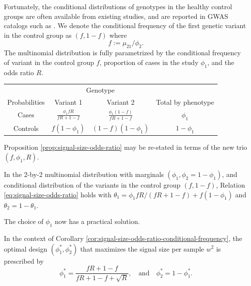 Fortunately, the conditional distributions of genotypes in the healthy control groups are often available from existing studies, and are reported in GWAS catalogs such as \cite{macarthur2016new}.
We denote the conditional frequency of the first genetic variant in the control group as $(f, 1-f)$ where
$$
f := \mu_{21} / \phi_2.
$$
The multinomial distribution is fully parametrized by the conditional frequency of variant in the control group $f$, proportion of cases in the study $\phi_1$, and the odds ratio $R$.
\begin{center}
    \begin{tabular}{cccc}
    \hline
    & \multicolumn{2}{c}{Genotype} \\
    \cline{2-3}
    Probabilities & Variant 1 & Variant 2 & Total by phenotype \\
    \hline
    Cases & $\frac{\phi_1fR}{fR+1-f}$ & $\frac{\phi_1(1-f)}{fR+1-f}$ & $\phi_1$ \\
    Controls & $f(1-\phi_1)$ & $(1-f)(1-\phi_1)$ & $1-\phi_1$ \\
    \hline
    \end{tabular}
\end{center}
Proposition \ref{prop:signal-size-odds-ratio} may be re-stated in terms of the new trio $(f, \phi_1, R)$.


\begin{corollary} \label{cor:signal-size-odds-ratio-conditional-frequency}
In the 2-by-2 multinomial distribution with marginals $(\phi_1, \phi_2 = 1-\phi_1)$, and conditional distribution of the variants in the control group $(f, 1-f)$,
Relation \eqref{eq:signal-size-odds-ratio} holds with $\theta_1 = {\phi_1fR}/{(fR+1-f)} + f(1-\phi_1)$ and $\theta_2 = 1-\theta_1$.
\end{corollary} 

The choice of $\phi_1$ now has a practical solution.

\begin{corollary} \label{cor:optimal-design}
In the context of Corollary \ref{cor:signal-size-odds-ratio-conditional-frequency},
the optimal design $(\phi^*_1, \phi^*_2)$ that maximizes the signal size per sample $w^2$ is prescribed by
\begin{equation} \label{eq:optimal-design}
    \phi_1^* = \frac{fR+1-f}{fR+1-f+\sqrt{R}}, \quad\text{and}\quad 
    \phi_2^* = 1-\phi_1^*.
\end{equation}
\end{corollary} 

